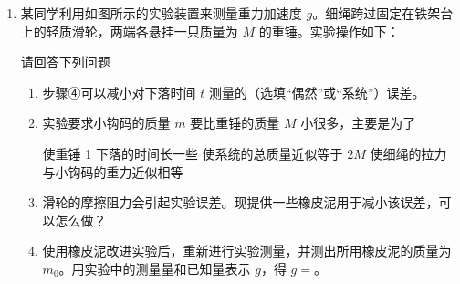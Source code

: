 \documentclass[\gkver]{gaokaozhenti}
\begin{document}
\begin{enumerate}
{（2）将数据描点连线，作出一条倾斜的直线。由闭合电路欧姆定律 $E=I(R+r)$ 得 $R=E\cdot\frac{1}{I}-r$，所以图线的斜率表示电源电动势 $E=\frac{8-(-1.2)}{6.7-0}\UV=1.37\UV$，截距绝对值表示内阻，$r=0.4\times3.0\UO=1.20\UO$；用电压表与电流表并联，可测得电流表的内阻 $R_{A}=\frac{U_{V}}{I_{A}}=\frac{66.0\times10^{-3}}{33\times10^{-3}}\UO=0.20\UO$，考虑电表内阻对实验的影响，则 $E=I(R+R_{A}+r)$，得 $R=E\cdot\frac{1}{I}-(R_{A}+r)$，所以图线的斜率仍表示电动势，电动势的准确值为 $1.37\UV$，图线的截距表示 $(R_{A}+r)$，所以内阻精确值为 $r=(1.20-0.20)\UO=1.00\UO$。

图像如图所示：

\onepicture[w=6.39cm]{}
}

\item
某同学利用如图所示的实验装置来测量重力加速度 $g$。细绳跨过固定在铁架台上的轻质滑轮，两端各悬挂一只质量为 $M$ 的重锤。实验操作如下：



请回答下列问题
\begin{enumerate}
	\item
	步骤④可以减小对下落时间 $t$ 测量的（选填“偶然”或“系统”）误差。
	\item
	实验要求小钩码的质量 $m$ 要比重锤的质量 $M$ 小很多，主要是为了
	
	{使重锤 1 下落的时间长一些}
	{使系统的总质量近似等于 $2M$}
	{使细绳的拉力与小钩码的重力近似相等}
	\item
	滑轮的摩擦阻力会引起实验误差。现提供一些橡皮泥用于减小该误差，可以怎么做？
	\item
	使用橡皮泥改进实验后，重新进行实验测量，并测出所用橡皮泥的质量为 $m_{0}$。用实验中的测量量和已知量表示 $g$，得 $g=$。
\end{enumerate}


\end{enumerate}
\end{document}
